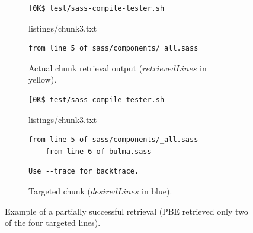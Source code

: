 \documentclass[10pt,journal,compsoc]{IEEEtran}
\begin{document}
\begin{figure}[tbp]
  \centering
\begin{subfigure}[b]{\columnwidth}
  \begin{lstlisting}[breaklines=true,frame=tlr]
[0K$ test/sass-compile-tester.sh
  \end{lstlisting}
  \vspace{-\baselineskip}
  
	{listings/chunk3.txt}
  \vspace{-\baselineskip}
  \begin{lstlisting}[breaklines=true,frame=blr]
	from line 5 of sass/components/_all.sass
  \end{lstlisting}
	\caption{Actual chunk retrieval output ($retrievedLines$
	in yellow).}
	\label{lst:pbe-part-success-output}
\end{subfigure}

\begin{subfigure}[b]{\columnwidth}
  \begin{lstlisting}[breaklines=true,frame=tlr]
[0K$ test/sass-compile-tester.sh
  \end{lstlisting}
  \vspace{-\baselineskip}
  
	{listings/chunk3.txt}
  \vspace{-\baselineskip}
  \begin{lstlisting}[backgroundcolor=\color{Cerulean!60},breaklines=true,frame=rl]
	from line 5 of sass/components/_all.sass
	from line 6 of bulma.sass
  \end{lstlisting}
  \vspace{-\baselineskip}
  \begin{lstlisting}[breaklines=true,frame=blr]
  Use --trace for backtrace.
  \end{lstlisting}
	\caption{Targeted chunk ($desiredLines$ in blue).}
	\label{lst:pbe-part-success-desired}
\end{subfigure}
  \caption{Example of a partially successful retrieval
  (PBE retrieved only
  two of the four targeted lines).}
  \label{lst:pbe-partially-successful}
\end{figure}
\end{document}
